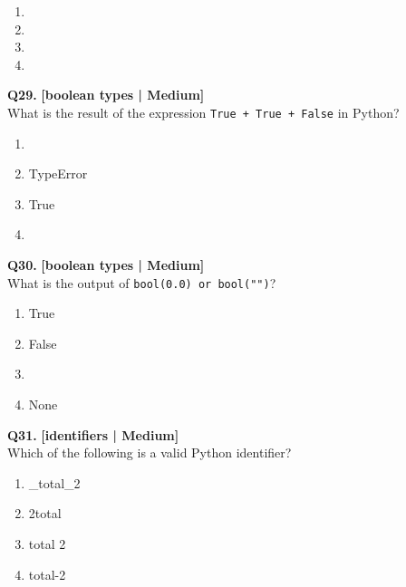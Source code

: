 \begin{enumerate}[label=(\alph*),topsep=2pt,itemsep=1pt,partopsep=0pt,parsep=0pt]
    \item {}
    \item {}
    \item {}
    \item {}
\end{enumerate}
\vspace{2mm}

\noindent\textbf{Q29.} \hfill {\small\color{LPUOrange}\textbf{[boolean types | Medium]}}\\[2pt]
What is the result of the expression \texttt{True + True + False} in Python?

\begin{enumerate}[label=(\alph*),topsep=2pt,itemsep=1pt,partopsep=0pt,parsep=0pt]
    \item {}
    \item \relax TypeError
    \item \relax True
    \item {}
\end{enumerate}
\vspace{2mm}

\noindent\textbf{Q30.} \hfill {\small\color{LPUOrange}\textbf{[boolean types | Medium]}}\\[2pt]
What is the output of \texttt{bool(0.0) or bool("")}?

\begin{enumerate}[label=(\alph*),topsep=2pt,itemsep=1pt,partopsep=0pt,parsep=0pt]
    \item \relax True
    \item \relax False
    \item {}
    \item \relax None
\end{enumerate}
\vspace{2mm}

\noindent\textbf{Q31.} \hfill {\small\color{LPUOrange}\textbf{[identifiers | Medium]}}\\[2pt]
Which of the following is a valid Python identifier?

\begin{enumerate}[label=(\alph*),topsep=2pt,itemsep=1pt,partopsep=0pt,parsep=0pt]
    \item \relax \_total\_2
    \item \relax 2total
    \item \relax total 2
    \item \relax total-2
\end{enumerate}
\vspace{2mm}

